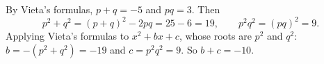 By Vieta's formulas, $p+q=-5$ and $pq=3$. Then
\[p^2+q^2=(p+q)^2-2pq=25-6=19,\qquad p^2q^2=(pq)^2=9 .\]
Applying Vieta's formulas to $x^2+bx+c$, whose roots are $p^2$ and $q^2$: $b=-(p^2+q^2)=-19$ and $c=p^2q^2=9$. So $b+c=\boxed{-10}$.
